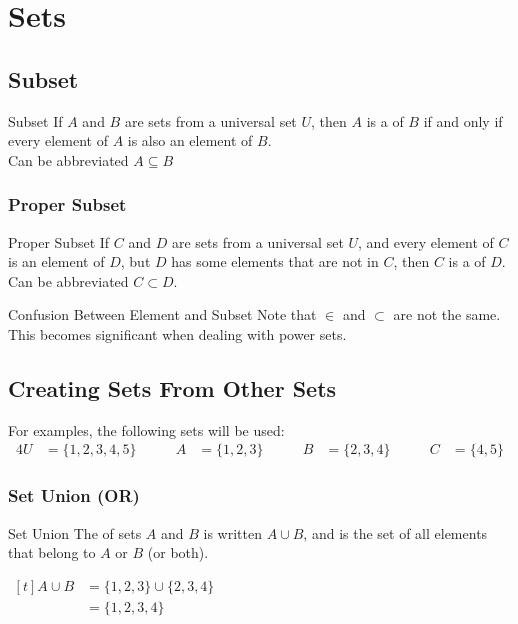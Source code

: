 \documentclass[../notes.tex]{subfiles}
\begin{document}
	\ifSubfilesClassLoaded{\setcounter{chapter}{2}}{}
	\chapter{Sets}
		\section{Subset}
			\begin{definition}{Subset}
				If $A$ and $B$ are sets from a universal set $U$, then $A$ is a  of $B$ if and only if every element of $A$ is also an element of $B$.\\
				Can be abbreviated $A \subseteq B$
			\end{definition}
			\subsection{Proper Subset}
				\begin{definition}{Proper Subset}
					If $C$ and $D$ are sets from a universal set $U$, and every element of $C$ is an element of $D$, but $D$ has some elements that are not in $C$, then $C$ is a  of $D$.\\
					Can be abbreviated $C \subset D$.
				\end{definition}
				\begin{sidenote}{Confusion Between Element and Subset}
					Note that $\in$ and $\subset$ are not the same. This becomes significant when dealing with power sets.
				\end{sidenote}
		\pagebreak
		\section{Creating Sets From Other Sets}
			For examples, the following sets will be used:
			\begin{alignat*}{4}
				U &= \{1, 2, 3, 4, 5\}\qquad & A &= \{1, 2, 3\} \qquad & B &= \{2, 3, 4\} \qquad & C &= \{4, 5\}
			\end{alignat*}

			\subsection[Set Union]{Set Union (OR)}
				\begin{definition}{Set Union}
					The  of sets $A$ and $B$ is written $A \cup B$, and is the set of all elements that belong to $A$ or $B$ (or both).
				\end{definition}
				\nopagebreak
				\begin{center}
					\begin{venntwo}[][$A \cup B = \bigl\{x \mid x \in A$ or $x \in B\bigr\}$]
						\fillA
						\fillB
					\end{venntwo}
				\end{center}
				\begin{example}[hbox] $
					\begin{aligned}[t]
						A \cup B &= \{1, 2, 3\} \cup \{2, 3, 4\}\\
						&= \{1, 2, 3, 4\}
					\end{aligned} $
				\end{example}
\end{document}
